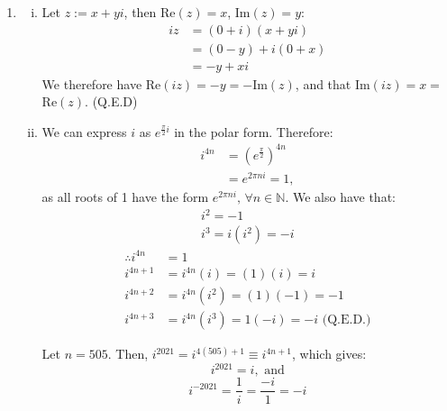 \documentclass[a4paper, titlepage, DIV=14]{scrartcl}
\begin{document}
\begin{enumerate}
        \item 
        \begin{enumerate}[i)]
            \item Let $z:=x+yi$, then Re$(z)=x$, Im$(z)=y$:
            \begin{align*}
                iz &= (0+i)(x+yi) \\
                &= (0-y) + i(0+x) \\
                &= -y + xi
            \end{align*}
            We therefore have Re$(iz)=-y=-$Im$(z)$, and that Im$(iz)=x=$Re$(z)$. (Q.E.D)
        
            \item We can express $i$ as $e^{\frac{\pi}{2}i}$ in the polar form. Therefore:
            \begin{align*}
                i^{4n} &= (e^{\frac{\pi}{2}})^{4n} \\
                    &= e^{2\pi ni} = 1,
            \end{align*}
            as all roots of 1 have the form $e^{2\pi ni}, \, \forall n \in \mathbb{N}$. We 
            also have that:
            \begin{gather*}
                i^{2} = -1 \\
                i^{3} = i(i^{2}) = -i
            \end{gather*}
            \begin{align*}
                \therefore i^{4n} &= 1 \\
                i^{4n+1} &= i^{4n}(i) = (1)(i) = i \\
                i^{4n+2} &= i^{4n}(i^{2}) = (1)(-1) = -1 \\
                i^{4n+3} &= i^{4n}(i^{3}) = 1 (-i) = -i     \text{ (Q.E.D.)}
            \end{align*}

            Let $n=505$. Then, $i^{2021} = i^{4(505)+1} \equiv i^{4n+1}$, which gives:
            \begin{equation*}
                i^{2021} = i, \text{ and}
            \end{equation*}
            \begin{equation*}
                i^{-2021} = \frac{1}{i} = \frac{-i}{1} = -i
            \end{equation*}


\end{enumerate}
\end{enumerate}
\end{document}
